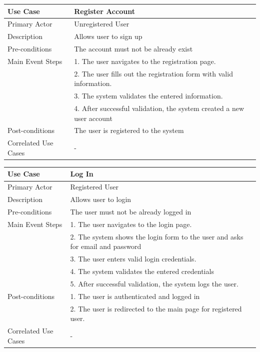 \begin{longtable}{|p{}|p{}|}
    \hline
    \rowcolor{lightblue}
    \textbf{Use Case} & \textbf{Register Account} \\
    \hline
    Primary Actor & Unregistered User\\
    \hline
    Description & Allows user to sign up\\
    \hline
    Pre-conditions & The account must not be already exist\\
    \hline
    Main Event Steps &   1. The user navigates to the registration page. \\
    & 2. The user fills out the registration form with valid information. \\
    & 3. The system validates the entered information. \\
    & 4. After successful validation, the system created a new user account \\
    \hline
    Post-conditions &The user is registered to the system \\
    \hline
    Correlated Use Cases & -\\
    \hline
\end{longtable}

\begin{longtable}{|p{}|p{}|}
    \hline
    \rowcolor{lightblue}
    \textbf{Use Case} & \textbf{Log In} \\
    \hline
    Primary Actor &Registered User\\
    \hline
    Description & Allows user to login \\
    \hline
    Pre-conditions & The user must not be already logged in\\
    \hline
    Main Event Steps & 1. The user navigates to the login page. \\
    & 2. The system shows the login form to the user and asks for email and password \\
    & 3. The user enters valid login credentials. \\
    & 4. The system validates the entered credentials \\
    & 5. After successful validation, the system logs the user. \\
    \hline
    Post-conditions & 1. The user is authenticated and logged in \\
    & 2. The user is redirected to the main page for registered user. \\
    \hline
    Correlated Use Cases & -\\
    \hline
\end{longtable}

